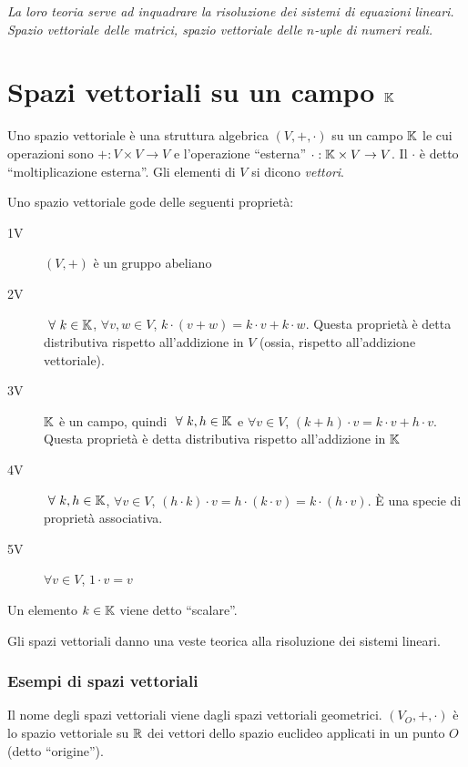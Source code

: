 \begin{center}
\indent
\textit{La loro teoria serve ad inquadrare la risoluzione dei sistemi di equazioni lineari. \\ Spazio vettoriale delle matrici, spazio vettoriale delle $n$-uple di numeri reali.}
\end{center}

\section{Spazi vettoriali su un campo $\mathbb{K}$}

Uno spazio vettoriale \`e una struttura algebrica $(V, +, \cdot)$ su un campo $\mathbb{K}$ le cui operazioni sono $+ : V \times V \to V$ e l'operazione ``esterna'' $\cdot : \mathbb{K} \times V \to V$. Il $\cdot$ \`e detto ``moltiplicazione esterna''. Gli elementi di $V$ si dicono \textit{vettori}.

Uno spazio vettoriale gode delle seguenti propriet\`a:
\begin{description}
    \item[1V] $(V, +)$ \`e un gruppo abeliano
    \item[2V] $\forall k \in \field$, $\forall v, w \in V$, $k \cdot (v + w) = k \cdot v + k \cdot w$. Questa propriet\`a \`e detta distributiva rispetto all'addizione in $V$ (ossia, rispetto all'addizione vettoriale).
    \item[3V] $\mathbb{K}$ \`e un campo, quindi $\forall k, h \in \field$ e $\forall v \in V$, $(k + h) \cdot v = k \cdot v + h \cdot v$. Questa propriet\`a \`e detta distributiva rispetto all'addizione in $\mathbb{K}$
    \item[4V] $\forall k, h \in \field$, $\forall v \in V$, $(h \cdot k ) \cdot v = h \cdot (k \cdot v) = k \cdot (h \cdot v)$. \`E una specie di propriet\`a associativa.
    \item[5V] $\forall v \in V$, $1 \cdot v = v$
\end{description}

Un elemento $k \in \mathbb{K}$ viene detto ``scalare''.

Gli spazi vettoriali danno una veste teorica alla risoluzione dei sistemi lineari.

\subsubsection{Esempi di spazi vettoriali}

Il nome degli spazi vettoriali viene dagli spazi vettoriali geometrici. $(V_O, +, \cdot)$ \`e lo spazio vettoriale su $\mathbb{R}$ dei vettori dello spazio euclideo applicati in un punto $O$ (detto ``origine'').

